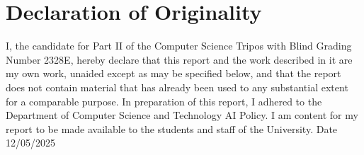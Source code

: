 \section*{Declaration of Originality}
I, the candidate for Part II of the Computer Science Tripos with Blind Grading Number 2328E, hereby declare that this report and the work described in it are my own work, unaided except as may be specified below, and that the report does not contain material that has already been used to any substantial extent for a comparable purpose. In preparation of this report, I adhered to the Department of Computer Science and Technology AI Policy. I am content for my report to be made available to the students and staff of the University. 
Date 12/05/2025